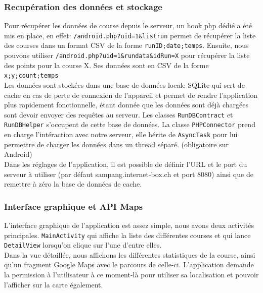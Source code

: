\documentclass[a4paper,11pt]{article}
\begin{document}
\subsubsection{Recupération des données et stockage}
Pour récupérer les données de course depuis le serveur, un hook php dédié a été mis en place, en effet: \newline
\verb+/android.php?uid=1&listrun+ \newline
permet de récupérer la liste des courses dans un format CSV de la forme \verb+runID;date;temps+. Ensuite, nous pouvons utiliser \newline
\verb+/android.php?uid=1&rundata&idRun=X+ \newline
pour récupérer la liste des points pour la course X. Ses données sont en CSV de la forme
\verb+x;y;count;temps+ \\

Les données sont stockées dans une base de données locale SQLite qui sert de cache en cas de perte de connexion de l'appareil et permet de rendre l'application plus rapidement fonctionnelle, étant donnée que les données sont déjà chargées sont devoir envoyer des requêtes au serveur. Les classes \verb+RunDBContract+ et \verb+RunDBHelper+ s'occupent de cette base de données. La classe \verb+PHPConnector+ prend en charge l'intéraction avec notre serveur, elle hérite de \verb+AsyncTask+ pour lui permettre de charger les données dans un thread séparé. (obligatoire sur Android)\\

Dans les réglages de l'application, il est possible de définir l'URL et le port du serveur à utiliser (par défaut sampang.internet-box.ch et port 8080) ainsi que de remettre à zéro la base de données de cache.

\subsubsection{Interface graphique et API Maps}
L'interface graphique de l'application est assez simple, nous avons deux activités principales. \verb+MainActivity+ qui affiche la liste des différentes courses et qui lance \verb+DetailView+ lorsqu'on clique sur l'une d'entre elles. \\

Dans la vue détaillée, nous affichons les différentes statistiques de la course, ainsi qu'un fragment Google Maps avec le parcours de celle-ci. L'application demande la permission à l'utilisateur à ce moment-là pour utiliser sa localisation et pouvoir l'afficher sur la carte également.
\end{document}
